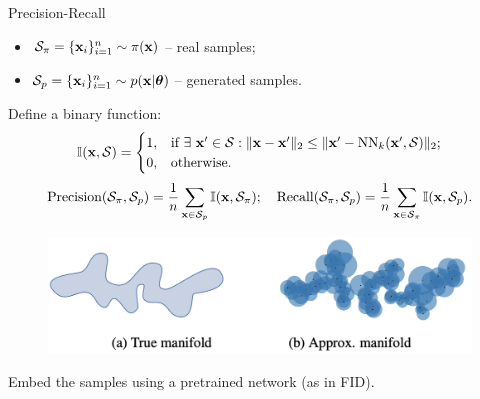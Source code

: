 \documentclass{beamer}
\begin{document}
\begin{frame}{Precision-Recall}
	\vspace{-0.2cm}
	\begin{itemize}
		\item $\mathcal{S}_{\pi} = \{\mathbf{x}_i\}_{i=1}^{n} \sim \pi(\mathbf{x})$ -- real samples;
		\item $\mathcal{S}_{p} = \{\mathbf{x}_i\}_{i=1}^{n} \sim p(\mathbf{x} | \boldsymbol{\theta})$ -- generated samples.
	\end{itemize}
	\eqpause
	Define a binary function:
	\vspace{-0.2cm}
	\[
		\mathbb{I}(\mathbf{x}, \mathcal{S}) =
		\begin{cases}
			1, & \text{if } \exists\ \mathbf{x}' \in \mathcal{S}: \| \mathbf{x} - \mathbf{x}'\|_2 \leq \| \mathbf{x}' - \text{NN}_k(\mathbf{x}', \mathcal{S})\|_2; \\
			0, & \text{otherwise.}
		\end{cases}
	\]
	\eqpause
	\vspace{-0.3cm}
	\[
		\text{Precision} (\mathcal{S}_{\pi}, \mathcal{S}_{p}) = \frac{1}{n} \sum_{\mathbf{x} \in \mathcal{S}_{p}} \mathbb{I}(\mathbf{x}, \mathcal{S}_{\pi}); \quad \text{Recall} (\mathcal{S}_{\pi}, \mathcal{S}_{p}) = \frac{1}{n} \sum_{\mathbf{x} \in \mathcal{S}_{\pi}} \mathbb{I}(\mathbf{x}, \mathcal{S}_{p}).
	\]
	\eqpause
	\vspace{-0.6cm}
	\begin{figure}
		\includegraphics[width=0.75\linewidth]{figs/pr_k_nearest}
	\end{figure}
	\eqpause
	Embed the samples using a pretrained network (as in FID).
\end{frame}
\end{document}

